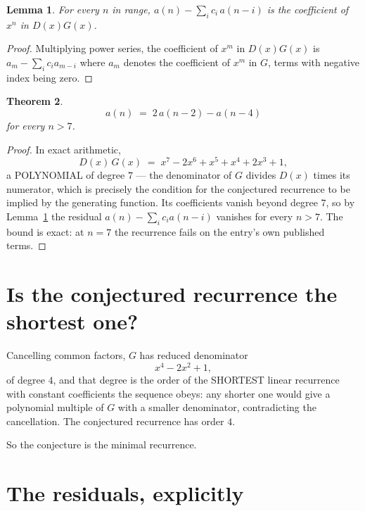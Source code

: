 \documentclass[11pt,a4paper]{article}
\theoremstyle{plain}
\newtheorem{theorem}{Theorem}
\newtheorem{lemma}[theorem]{Lemma}
\theoremstyle{definition}
\begin{document}
\begin{lemma}\label{lem:key}
For every $n$ in range, $a(n)-\sum_i c_i\,a(n-i)$ is the coefficient of $x^{n}$ in
$D(x)G(x)$.
\end{lemma}

\begin{proof}
Multiplying power series, the coefficient of $x^{m}$ in $D(x)G(x)$ is
$a_m-\sum_i c_i a_{m-i}$ where $a_m$ denotes the coefficient of $x^{m}$ in $G$, terms with
negative index being zero.
\end{proof}

\begin{theorem}
\[
a(n)\;=\;2\,a(n-2) - a(n-4)
\]
for every $n>7$.
\end{theorem}

\begin{proof}
In exact arithmetic,
\[
D(x)\,G(x)\;=\;x^{7} - 2 x^{6} + x^{5} + x^{4} + 2 x^{3} + 1,
\]
a POLYNOMIAL of degree $7$ --- the denominator of $G$ divides $D(x)$ times its numerator,
which is precisely the condition for the conjectured recurrence to be implied by the
generating function. Its coefficients vanish beyond degree $7$, so by
Lemma~\ref{lem:key} the residual $a(n)-\sum_ic_ia(n-i)$ vanishes for every
$n>7$. The bound is exact: at $n=7$ the recurrence fails on the entry's own published terms.
\end{proof}

\section{Is the conjectured recurrence the shortest one?}

Cancelling common factors, $G$ has reduced denominator
\[
x^{4} - 2 x^{2} + 1,
\]
of degree $4$, and that degree is the order of the SHORTEST linear recurrence with
constant coefficients the sequence obeys: any shorter one would give a polynomial multiple of
$G$ with a smaller denominator, contradicting the cancellation. The conjectured recurrence has
order $4$.

So the conjecture is the minimal recurrence.

\section{The residuals, explicitly}
\end{document}
